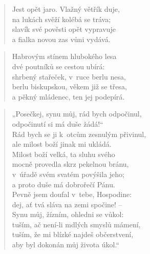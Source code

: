 \begin{verse}
Jest opět jaro. Vlažný větřík duje, \\
na lukách svěží kolébá se tráva; \\
slavík své pověsti opět vypravuje \\
a fialka novou zas vůni vydává.
\end{verse}

\begin{verse}
Habrovým stínem hlubokého lesa \\
dvé poutníků se cestou ubírá: \\
shrbený stařeček, v~ruce berlu nesa, \\
berlu biskupskou, věkem již se třesa, \\
a pěkný mládenec, ten jej podepírá.
\end{verse}

\begin{verse}
„Posečkej, synu můj, rád bych odpočinul, \\
odpočinutí si má duše žádá!“ \\
Rád bych se ji k~otcům zesnulým přivinul, \\
ale milost boží jinak mi ukládá. \\
Milost boží velká, ta sluhu svého \\
mocně provedla skrz pekelnou bránu, \\
v~úřadě svém svatém povýšila jeho; \\
a proto duše má dobrořečí Pánu. \\
Pevně jsem doufal v~tebe, Hospodine: \\
dej, ať tvá sláva na zemi spočine! -- \\
Synu můj, žízním, ohledni se vůkol: \\
tuším, ač není-li mdlých smyslů mámení, \\
tuším, že mi blízké najdeš občerstvení, \\
aby byl dokonán můj života úkol.“
\end{verse}

